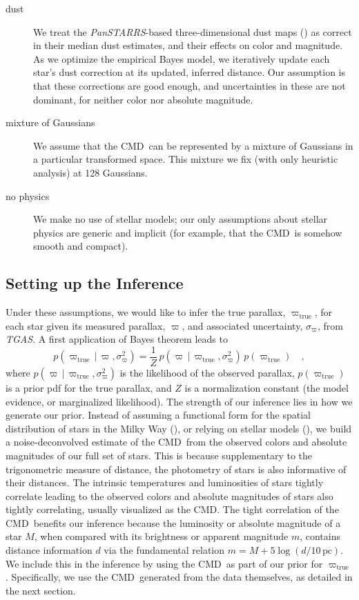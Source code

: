 \documentclass[modern]{aastex61}
\newcommand{\acronym}[1]{{\small{#1}}}
\newcommand{\project}[1]{\textsl{#1}}
\newcommand{\tgas}{\project{\acronym{TGAS}}}
\newcommand{\panstarrs}{\project{Pan\acronym{STARRS}}}
\newcommand{\cmd}{\acronym{CMD}}
\newcommand{\given}{\,|\,}
\newcommand{\true}{\mathrm{true}}
\begin{document}
\begin{description}
\item[dust] We treat the \panstarrs-based three-dimensional dust maps (\citealt{green15})
  as correct in their median dust estimates, and their
  effects on color and magnitude. As we optimize the empirical Bayes model, we iteratively update each star's
  dust correction at its updated, inferred distance. Our assumption is that these corrections are
  good enough, and uncertainties in these are not dominant, for neither
  color nor absolute magnitude.
\item[mixture of Gaussians] We assume that the \cmd\ can be represented by a mixture of
  Gaussians in a particular transformed space. This mixture we fix
  (with only heuristic analysis) at 128 Gaussians.
\item[no physics] We make no use of stellar models; our only assumptions about
  stellar physics are generic and implicit (for example, that the
  \cmd\ is somehow smooth and compact).
\end{description}

\subsection{Setting up the Inference}

Under these assumptions, we would like to infer the true parallax, $\varpi_{\true}$, for each star given its measured parallax, $\varpi$, and associated uncertainty, $\sigma_{\varpi}$, from \tgas.
A first application of Bayes theorem leads to
\begin{equation}
p(\varpi_{\true} \given \varpi, \sigma^2_{\varpi}) = \frac{1}{Z}\,p(\varpi \given \varpi_{\true}, \sigma^2_{\varpi}) \, p(\varpi_{\true}) \quad ,
\label{eq:bayes}
\end{equation}
where $p(\varpi \given \varpi_{\true}, \sigma^2_{\varpi})$ is the likelihood of the observed parallax, $p(\varpi_{\true})$ is a prior pdf for the true
parallax, and $Z$ is a normalization constant (the model evidence, or marginalized likelihood).
The strength of our inference lies in how we generate our prior.
Instead of assuming a functional form for the spatial distribution of stars in the Milky Way (\citealt{astraatmadja16b}), or relying on stellar models (\citealt{gaia16}), we build a noise-deconvolved estimate of the \cmd\ from the observed colors and absolute magnitudes of our full set of stars.
This is because supplementary to the trigonometric measure of distance, the photometry of stars is also informative of their distances.
The intrinsic temperatures and luminosities of stars tightly correlate leading to the observed colors and absolute magnitudes of stars also tightly correlating, usually visualized as the \cmd.
The tight correlation of the \cmd\ benefits our inference because the luminosity or absolute magnitude of a star $M$, when compared with its brightness or apparent magnitude $m$, contains distance information $d$ via the fundamental relation $m=M+5\log(d/10\, \mathrm{pc})$.
We include this in the inference by using the \cmd\ as part of our prior for $\varpi_{\true}$.
Specifically, we use the \cmd\ generated from the data themselves, as detailed in the next section.
\end{document}
